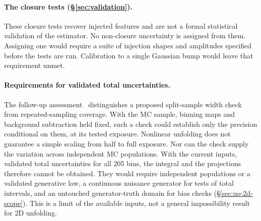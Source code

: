 \paragraph{The closure tests (\S\ref{sec:validation}).} These closure tests recover injected features and are not a formal statistical validation of the estimator. No non-closure uncertainty is assigned from them. Assigning one would require a suite of injection shapes and amplitudes specified before the tests are run. Calibration to a single Gaussian bump would leave that requirement unmet.

\paragraph{Requirements for validated total uncertainties.} The follow-up assessment~\cite{TwoDFollowup2026} distinguishes a proposed split-sample width check from repeated-sampling coverage. With the MC sample, binning maps and background subtraction held fixed, such a check could establish only the precision conditional on them, at its tested exposure. Nonlinear unfolding does not guarantee a simple scaling from half to full exposure. Nor can the check supply the variation across independent MC populations. With the current inputs, validated total uncertainties for all 205 bins, the integral and the projections therefore cannot be obtained. They would require independent populations or a validated generative law, a continuous nuisance generator for tests of total intervals, and an untouched generator-truth domain for bias checks (\S\ref{sec:uq-2d-scope}). This is a limit of the available inputs, not a general impossibility result for 2D unfolding.

